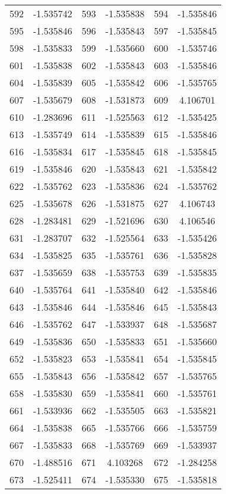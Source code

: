\documentclass[12pt]{article}
\begin{document}
\begin{longtable}{@{}cc|cc|cc@{}}
592 & -1.535742 & 593 & -1.535838 & 594 & -1.535846 \\
595 & -1.535846 & 596 & -1.535843 & 597 & -1.535845 \\
598 & -1.535833 & 599 & -1.535660 & 600 & -1.535746 \\
601 & -1.535838 & 602 & -1.535843 & 603 & -1.535846 \\
604 & -1.535839 & 605 & -1.535842 & 606 & -1.535765 \\
607 & -1.535679 & 608 & -1.531873 & 609 & 4.106701 \\
610 & -1.283696 & 611 & -1.525563 & 612 & -1.535425 \\
613 & -1.535749 & 614 & -1.535839 & 615 & -1.535846 \\
616 & -1.535834 & 617 & -1.535845 & 618 & -1.535845 \\
619 & -1.535846 & 620 & -1.535843 & 621 & -1.535842 \\
622 & -1.535762 & 623 & -1.535836 & 624 & -1.535762 \\
625 & -1.535678 & 626 & -1.531875 & 627 & 4.106743 \\
628 & -1.283481 & 629 & -1.521696 & 630 & 4.106546 \\
631 & -1.283707 & 632 & -1.525564 & 633 & -1.535426 \\
634 & -1.535825 & 635 & -1.535761 & 636 & -1.535828 \\
637 & -1.535659 & 638 & -1.535753 & 639 & -1.535835 \\
640 & -1.535764 & 641 & -1.535840 & 642 & -1.535846 \\
643 & -1.535846 & 644 & -1.535846 & 645 & -1.535843 \\
646 & -1.535762 & 647 & -1.533937 & 648 & -1.535687 \\
649 & -1.535836 & 650 & -1.535833 & 651 & -1.535660 \\
652 & -1.535823 & 653 & -1.535841 & 654 & -1.535845 \\
655 & -1.535843 & 656 & -1.535842 & 657 & -1.535765 \\
658 & -1.535830 & 659 & -1.535841 & 660 & -1.535761 \\
661 & -1.533936 & 662 & -1.535505 & 663 & -1.535821 \\
664 & -1.535838 & 665 & -1.535766 & 666 & -1.535759 \\
667 & -1.535833 & 668 & -1.535769 & 669 & -1.533937 \\
670 & -1.488516 & 671 & 4.103268 & 672 & -1.284258 \\
673 & -1.525411 & 674 & -1.535330 & 675 & -1.535818 \\

\end{longtable}
\end{document}
